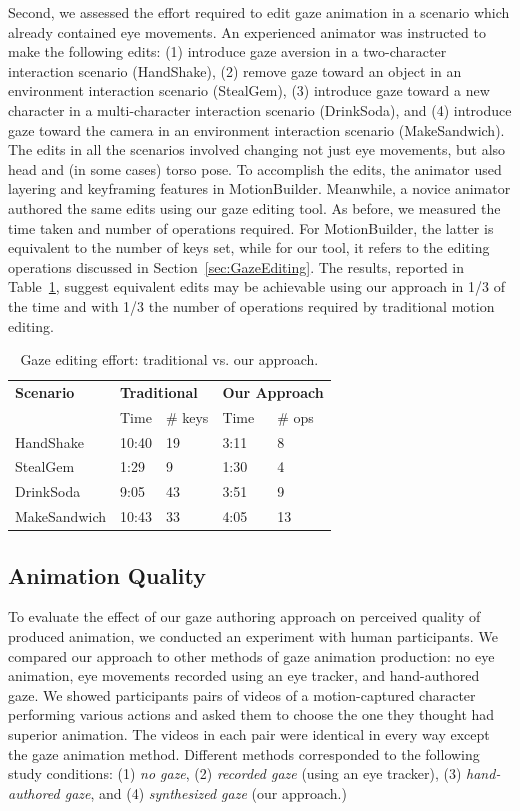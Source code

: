 Second, we assessed the effort required to edit gaze animation in a scenario which already contained eye movements. An experienced animator was instructed to make the following edits: (1) introduce gaze aversion in a two-character interaction scenario (HandShake), (2) remove gaze toward an object in an environment interaction scenario (StealGem), (3) introduce gaze toward a new character in a multi-character interaction scenario (DrinkSoda), and (4) introduce gaze toward the camera in an environment interaction scenario (MakeSandwich). The edits in all the scenarios involved changing not just eye movements, but also head and (in some cases) torso pose. To accomplish the edits, the animator used layering and keyframing features in MotionBuilder. Meanwhile, a novice animator authored the same edits using our gaze editing tool. As before, we measured the time taken and number of operations required. For MotionBuilder, the latter is equivalent to the number of keys set, while for our tool, it refers to the editing operations discussed in Section~\ref{sec:GazeEditing}. The results, reported in Table~\ref{tab:GazeEditingEffortResults}, suggest equivalent edits may be achievable using our approach in 1/3 of the time and with 1/3 the number of operations required by traditional motion editing.
%
\begin{table}
\centering
\def\arraystretch{1.5}
\begin{tabular}{|l||l|l|l|l|}
\hline
\textbf{Scenario} & \multicolumn{2}{l|}{\textbf{Traditional}} & \multicolumn{2}{l|}{\textbf{Our Approach}} \\
\cline{2-5}
& Time & \# keys & Time & \# ops  \\
\hline
HandShake & 10:40 & 19 & 3:11 & 8 \\
StealGem & 1:29 & 9 & 1:30 & 4 \\
DrinkSoda & 9:05 & 43 & 3:51 & 9 \\
MakeSandwich & 10:43 & 33 & 4:05 & 13 \\
\hline
\end{tabular}
\caption{Gaze editing effort: traditional vs. our approach.}
\label{tab:GazeEditingEffortResults}
\end{table}

\subsection{Animation Quality}
\label{sec:GazeAnimationQualityEvaluation}

To evaluate the effect of our gaze authoring approach on perceived quality of produced animation, we conducted an experiment with human participants. We compared our approach to other methods of gaze animation production: no eye animation, eye movements recorded using an eye tracker, and hand-authored gaze. We showed participants pairs of videos of a motion-captured character performing various actions and asked them to choose the one they thought had superior animation. The videos in each pair were identical in every way except the gaze animation method. Different methods corresponded to the following study conditions: (1) \emph{no gaze}, (2) \emph{recorded gaze} (using an eye tracker), (3) \emph{hand-authored gaze}, and (4) \emph{synthesized gaze} (our approach.)

